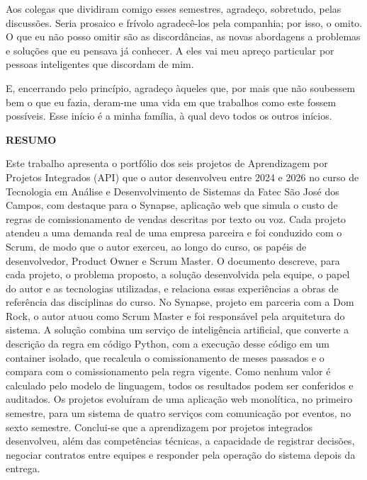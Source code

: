 \documentclass[12pt,a4paper]{article}
\newcommand{\titulocentralizado}[1]{\begin{center}\large\textbf{#1}\end{center}\vspace{12pt}}
\begin{document}
Aos colegas que dividiram comigo esses semestres, agradeço, sobretudo, pelas discussões.
Seria prosaico e frívolo agradecê-los pela companhia; por isso, o omito. O que eu não posso omitir
são as discordâncias, as novas abordagens a problemas e soluções que eu pensava já conhecer.
A eles vai meu apreço particular por pessoas inteligentes que discordam de mim.

E, encerrando pelo princípio, agradeço àqueles que, por mais que não soubessem bem o que eu fazia,
deram-me uma vida em que trabalhos como este fossem possíveis. Esse início é a minha família, à qual devo todos os outros inícios.

\clearpage

\titulocentralizado{RESUMO}

\noindent Este trabalho apresenta o portfólio dos seis projetos de Aprendizagem por Projetos Integrados (API)
que o autor desenvolveu entre 2024 e 2026 no curso de Tecnologia em Análise e Desenvolvimento de Sistemas da
Fatec São José dos Campos, com destaque para o Synapse, aplicação web que simula o custo de regras de comissionamento
de vendas descritas por texto ou voz. Cada projeto atendeu a uma demanda real de uma empresa parceira e
foi conduzido com o Scrum, de modo que o autor exerceu, ao longo do curso, os papéis de desenvolvedor,
Product Owner e Scrum Master. O documento descreve, para cada projeto, o problema proposto,
a solução desenvolvida pela equipe, o papel do autor e as tecnologias utilizadas, e relaciona essas experiências
a obras de referência das disciplinas do curso. No Synapse, projeto em parceria com a Dom Rock,
o autor atuou como Scrum Master e foi responsável pela arquitetura do sistema. A solução combina um serviço
de inteligência artificial, que converte a descrição da regra em código Python, com a execução desse código
em um container isolado, que recalcula o comissionamento de meses passados e o compara com o comissionamento
pela regra vigente. Como nenhum valor é calculado pelo modelo de linguagem, todos os resultados podem ser conferidos
e auditados. Os projetos evoluíram de uma aplicação web monolítica, no primeiro semestre,
para um sistema de quatro serviços com comunicação por eventos, no sexto semestre. Conclui-se que a aprendizagem
por projetos integrados desenvolveu, além das competências técnicas, a capacidade de registrar decisões,
negociar contratos entre equipes e responder pela operação do sistema depois da entrega.
\end{document}
